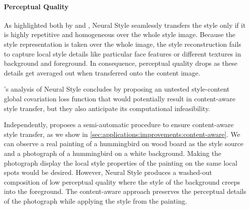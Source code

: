 \paragraph{Perceptual Quality}
As highlighted both by \citet{Nikulin2016} and \citet{Yin2016}, Neural Style seamlessly transfers the style only if it is highly repetitive and homogeneous over the whole style image.
Because the style representation is taken over the whole image, the style reconstruction fails to capture local style details like particular face features or different textures in background and foreground.
In consequence, perceptual quality drops as these details get averaged out when transferred onto the content image.

\citeauthor{Nikulin2016}'s analysis of Neural Style concludes by proposing an untested style-content global covariation loss function that would potentially result in content-aware style transfer, but they also anticipate its computational infeasibility.

Independently, \citeauthor{Yin2016} proposes a semi-automatic procedure to ensure content-aware style transfer, as we show in \autoref{sec:applications:improvements:content-aware}.
We can observe a real painting of a hummingbird on wood board as the style source and a photograph of a hummingbird on a white background.
Making the photograph display the local style properties of the painting on the same local spots would be desired.
However, Neural Style produces a washed-out composition of low perceptual quality where the style of the background creeps into the foreground.
The content-aware approach preserves the perceptual details of the photograph while applying the style from the painting.

